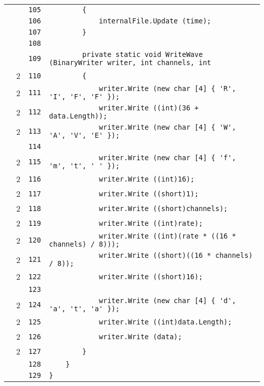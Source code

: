 \documentclass[a4paper,10pt]{article}
\begin{document}
\begin{longtable}[l]{lrrl}
\cellcolor{gray} &  & \verb~105~ & \verb~        {~\\
\cellcolor{gray} &  & \verb~106~ & \verb~            internalFile.Update (time);~\\
\cellcolor{gray} &  & \verb~107~ & \verb~        }~\\
\cellcolor{gray} &  & \verb~108~ & \verb~~\\
\cellcolor{gray} &  & \verb~109~ & \verb~        private static void WriteWave (BinaryWriter writer, int channels, int ~\\
\cellcolor{green} & 2 & \verb~110~ & \verb~        {~\\
\cellcolor{green} & 2 & \verb~111~ & \verb~            writer.Write (new char [4] { 'R', 'I', 'F', 'F' });~\\
\cellcolor{green} & 2 & \verb~112~ & \verb~            writer.Write ((int)(36 + data.Length));~\\
\cellcolor{green} & 2 & \verb~113~ & \verb~            writer.Write (new char [4] { 'W', 'A', 'V', 'E' });~\\
\cellcolor{gray} &  & \verb~114~ & \verb~~\\
\cellcolor{green} & 2 & \verb~115~ & \verb~            writer.Write (new char [4] { 'f', 'm', 't', ' ' });~\\
\cellcolor{green} & 2 & \verb~116~ & \verb~            writer.Write ((int)16);~\\
\cellcolor{green} & 2 & \verb~117~ & \verb~            writer.Write ((short)1);~\\
\cellcolor{green} & 2 & \verb~118~ & \verb~            writer.Write ((short)channels);~\\
\cellcolor{green} & 2 & \verb~119~ & \verb~            writer.Write ((int)rate);~\\
\cellcolor{green} & 2 & \verb~120~ & \verb~            writer.Write ((int)(rate * ((16 * channels) / 8)));~\\
\cellcolor{green} & 2 & \verb~121~ & \verb~            writer.Write ((short)((16 * channels) / 8));~\\
\cellcolor{green} & 2 & \verb~122~ & \verb~            writer.Write ((short)16);~\\
\cellcolor{gray} &  & \verb~123~ & \verb~~\\
\cellcolor{green} & 2 & \verb~124~ & \verb~            writer.Write (new char [4] { 'd', 'a', 't', 'a' });~\\
\cellcolor{green} & 2 & \verb~125~ & \verb~            writer.Write ((int)data.Length);~\\
\cellcolor{green} & 2 & \verb~126~ & \verb~            writer.Write (data);~\\
\cellcolor{green} & 2 & \verb~127~ & \verb~        }~\\
\cellcolor{gray} &  & \verb~128~ & \verb~    }~\\
\cellcolor{gray} &  & \verb~129~ & \verb~}~\\
\end{longtable}
\newpage
\end{document}
